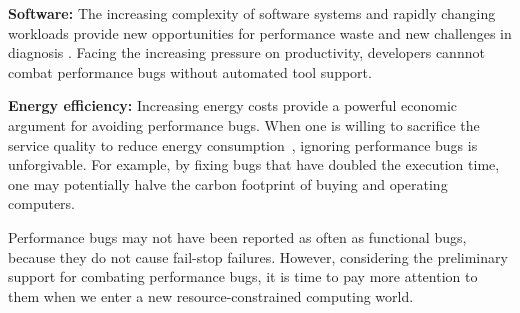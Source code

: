 {\bf Software:} The increasing complexity of software systems and rapidly 
changing workloads provide new opportunities for performance waste and
new challenges in diagnosis
\citep{BloatFSE2008}.
Facing the increasing pressure on productivity, 
developers cannnot combat performance bugs without automated tool support. 

{\bf Energy efficiency:} 
Increasing energy costs provide a powerful economic 
argument for avoiding performance bugs. 
When one is willing to sacrifice the service quality to reduce 
energy consumption~\citep{green.pldi10,asplos11karthik}, 
ignoring performance bugs is unforgivable.
For example, by fixing bugs that have doubled the
execution time,
one may potentially
halve the carbon footprint of buying and operating computers.

Performance bugs may not have been reported as often as functional bugs, because 
they do not cause fail-stop failures.
However, considering the preliminary support for
combating performance bugs,
it is time to pay more attention to them
when we enter a new resource-constrained computing world.
